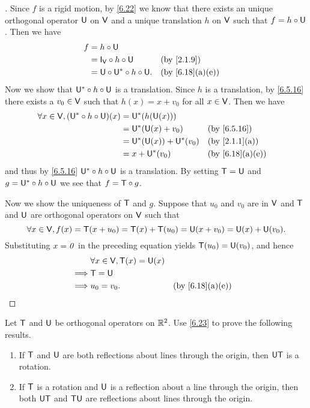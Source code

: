\begin{proof}[]
  Since \(f\) is a rigid motion, by \cref{6.22} we know that there exists an unique orthogonal operator \(\mathsf{U}\) on \(\mathsf{V}\) and a unique translation \(h\) on \(\mathsf{V}\) such that \(f = h \circ \mathsf{U}\).
  Then we have
  \begin{align*}
    f & = h \circ \U                                          \\
      & = \IT[\V] \circ h \circ \U        &  & \by{2.1.9}     \\
      & = \U \circ \U^* \circ h \circ \U. &  & \by{6.18}[a,e]
  \end{align*}
  Now we show that \(\mathsf{U}^* \circ h \circ \mathsf{U}\) is a translation.
  Since \(h\) is a translation, by \cref{6.5.16} there exists a \(v_0 \in \mathsf{V}\) such that \(h(x) = x + v_0\) for all \(x \in \mathsf{V}\).
  Then we have
  \begin{align*}
    \forall x \in \V, (\U^* \circ h \circ \U)(x) & = \U^*(h(\U(x)))                              \\
                                                 & = \U^*(\U(x) + v_0)       &  & \by{6.5.16}    \\
                                                 & = \U^*(\U(x)) + \U^*(v_0) &  & \by{2.1.1}[a]  \\
                                                 & = x + \U^*(v_0)           &  & \by{6.18}[a,e]
  \end{align*}
  and thus by \cref{6.5.16} \(\mathsf{U}^* \circ h \circ \mathsf{U}\) is a translation.
  By setting \(\mathsf{T} = \mathsf{U}\) and \(g = \mathsf{U}^* \circ h \circ \mathsf{U}\) we see that \(f = \mathsf{T} \circ g\).

  Now we show the uniqueness of \(\mathsf{T}\) and \(g\).
  Suppose that \(u_0\) and \(v_0\) are in \(\mathsf{V}\) and \(\mathsf{T}\) and \(\mathsf{U}\) are orthogonal operators on \(\mathsf{V}\) such that
  \[
    \forall x \in \mathsf{V}, f(x) = \mathsf{T}(x + u_0) = \mathsf{T}(x) + \mathsf{T}(u_0) = \mathsf{U}(x + v_0) = \mathsf{U}(x) + \mathsf{U}(v_0).
  \]
  Substituting \(x = \mathit{0}\) in the preceding equation yields \(\mathsf{T}(u_0) = \mathsf{U}(v_0)\), and hence
  \begin{align*}
             & \forall x \in \V, \T(x) = \U(x)                     \\
    \implies & \T = \U                                             \\
    \implies & u_0 = v_0.                      &  & \by{6.18}[a,e]
  \end{align*}
\end{proof}

\begin{ex}\label{ex:6.5.24}
  Let \(\mathsf{T}\) and \(\mathsf{U}\) be orthogonal operators on \(\mathbb{R}^2\).
  Use \cref{6.23} to prove the following results.
  \begin{enumerate}
    \item If \(\mathsf{T}\) and \(\mathsf{U}\) are both reflections about lines through the origin, then \(\mathsf{U} \mathsf{T}\) is a rotation.
    \item If \(\mathsf{T}\) is a rotation and \(\mathsf{U}\) is a reflection about a line through the origin, then both \(\mathsf{U} \mathsf{T}\) and \(\mathsf{T} \mathsf{U}\) are reflections about lines through the origin.
  \end{enumerate}
\end{ex}


